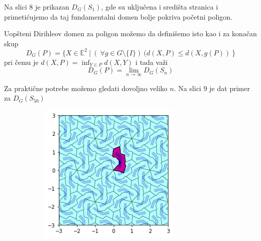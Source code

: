 \documentclass[11pt]{article}
\begin{document}
Na slici 8 je prikazan $D_G(S_1)$, gde su uklju\v cena i sredi\v sta stranica i primeti\' cujemo da taj fundamentalni domen bolje pokriva po\v cetni poligon. 


Uop\v steni Dirihleov domen za poligon mo\v zemo da defini\v semo isto kao i za kona\v can skup
$$D_G(P) = \{X \in \mathbb{E}^2\:|\:(\:\forall g \in G \setminus \{I\})\:(d(X,P)\leq d(X,g(P))\:\}$$
pri \v cemu je $d(X,P) = \inf_{Y \in P} d(X,Y)$ i tada va\v zi
$$ D_G(P) = \lim _{n\to \infty} D_G(S_n) $$


Za prakti\v cne potrebe mo\v zemo gledati dovoljno veliko $n$. Na slici 9 je dat primer za $D_G(S_{50})$

  \begin{figure}[H]
  \begin{subfigure}[b]{0.3\textwidth}
    \includegraphics[width=\textwidth]{output_17_0.png}
    \label{fig:f7}
  \end{subfigure}
  \begin{subfigure}[b]{0.3\textwidth}

\end{subfigure}
\end{figure}
\end{document}
